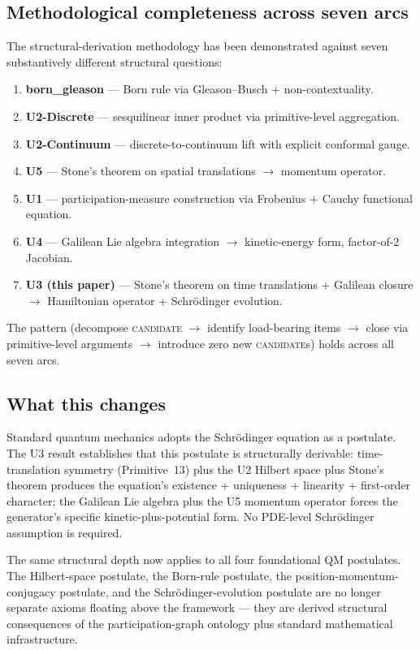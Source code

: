 \documentclass[11pt,a4paper]{article}
\begin{document}
\subsection{Methodological completeness across seven arcs}

The structural-derivation methodology has been demonstrated against seven substantively different structural questions:

\begin{enumerate}
  \item \textbf{born\_gleason} --- Born rule via Gleason--Busch + non-contextuality.
  \item \textbf{U2-Discrete} --- sesquilinear inner product via primitive-level aggregation.
  \item \textbf{U2-Continuum} --- discrete-to-continuum lift with explicit conformal gauge.
  \item \textbf{U5} --- Stone's theorem on spatial translations $\to$ momentum operator.
  \item \textbf{U1} --- participation-measure construction via Frobenius + Cauchy functional equation.
  \item \textbf{U4} --- Galilean Lie algebra integration $\to$ kinetic-energy form, factor-of-2 Jacobian.
  \item \textbf{U3 (this paper)} --- Stone's theorem on time translations + Galilean closure $\to$ Hamiltonian operator + Schr\"odinger evolution.
\end{enumerate}

The pattern (decompose \textsc{candidate} $\to$ identify load-bearing items $\to$ close via primitive-level arguments $\to$ introduce zero new \textsc{candidate}s) holds across all seven arcs.

\subsection{What this changes}

Standard quantum mechanics adopts the Schr\"odinger equation as a postulate. The U3 result establishes that this postulate is structurally derivable: time-translation symmetry (Primitive~13) plus the U2 Hilbert space plus Stone's theorem produces the equation's existence + uniqueness + linearity + first-order character; the Galilean Lie algebra plus the U5 momentum operator forces the generator's specific kinetic-plus-potential form. No PDE-level Schr\"odinger assumption is required.

The same structural depth now applies to all four foundational QM postulates. The Hilbert-space postulate, the Born-rule postulate, the position-momentum-conjugacy postulate, and the Schr\"odinger-evolution postulate are no longer separate axioms floating above the framework --- they are derived structural consequences of the participation-graph ontology plus standard mathematical infrastructure.
\end{document}
